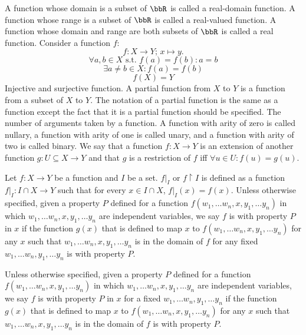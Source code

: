 \documentclass[a4paper,12pt]{article}
\begin{document}
A function whose domain is a subset of $\bbR$ is called a real-domain function. A function whose range is a subset of $\bbR$ is called a real-valued function. A function whose domain and range are both subsets of $\bbR$ is called a real function.
Consider a function $f$:
\[f\colon X\to Y;\,x\mapsto y.\]
\[\forall a,b\in X\text{\ s.t.\ } f(a)=f(b)\colon a=b\]
\[\exists a\neq b\in X\colon f(a)=f(b)\]
\[f(X)=Y\]
Injective and surjective function.
A partial function from $X$ to $Y$ is a function from a subset of $X$ to $Y$. The notation of a partial function is the same as a function except the fact that it is a partial function should be specified.
The number of arguments taken by a function. A function with arity of zero is called nullary, a function with arity of one is called unary, and a function with arity of two is called binary.
We say that a function $f\colon X\to Y$ is an extension of another function $g\colon U\subseteq X\to Y$ and that $g$ is a restriction of $f$ iff $\forall u\in U\colon f(u)=g(u)$.

Let $f\colon X\to Y$ be a function and $I$ be a set. $f\vert_I$ or $f\upharpoonright I$ is defined as a function $f\vert_I\colon I\cap X\to Y$ such that for every $x\in I\cap X$, $f\vert_I(x)=f(x)$.
Unless otherwise specified, given a property $P$ defined for a function $f(w_1,\dots w_n,x,y_1,\dots y_n)$ in which $w_1,\dots w_n,x,y_1,\dots y_n$ are independent variables, we say $f$ is with property $P$ in $x$ if the function $g(x)$ that is defined to map $x$ to $f(w_1,\dots w_n,x,y_1,\dots y_n)$ for any $x$ such that $w_1,\dots w_n,x,y_1,\dots y_n$ is in the domain of $f$ for any fixed $w_1,\dots w_n,y_1,\dots y_n$ is with property $P$.

Unless otherwise specified, given a property $P$ defined for a function $f(w_1,\dots w_n,x,y_1,\dots y_n)$ in which $w_1,\dots w_n,x,y_1,\dots y_n$ are independent variables, we say $f$ is with property $P$ in $x$ for a fixed $w_1,\dots w_n,y_1,\dots y_n$ if the function $g(x)$ that is defined to map $x$ to $f(w_1,\dots w_n,x,y_1,\dots y_n)$ for any $x$ such that $w_1,\dots w_n,x,y_1,\dots y_n$ is in the domain of $f$ is with property $P$.
\end{document}
